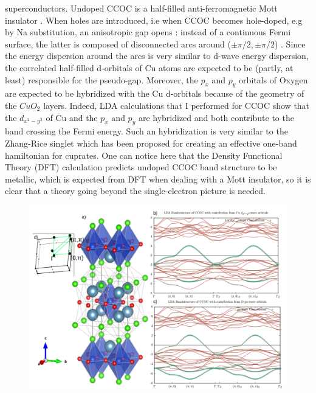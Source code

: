 \documentclass[12pt]{article}
\begin{document}
\begin{multicols}{2}
superconductors. Undoped CCOC is a half-filled anti-ferromagnetic Mott insulator 
\cite{Ronning-CCOCARPES}. When holes are introduced, i.e when CCOC becomes 
hole-doped, e.g by Na substitution, an anisotropic gap opens : instead of a 
continuous Fermi surface, the latter is composed of disconnected arcs around 
($\pm\pi/2,\pm\pi/2$) \cite{Norman-FS_destruction}. Since the energy dispersion 
around the arcs is very similar to d-wave energy dispersion, the correlated 
half-filled d-orbitals of Cu atoms are expected to be (partly, at least) 
responsible for the pseudo-gap. Moreover, the $p_{x}$ and $p_{y}$ orbitals of 
Oxygen are expected to be hybridized with the Cu d-orbitals because of the 
geometry of the $CuO_{2}$ layers. Indeed, LDA calculations that I performed for 
CCOC show that the $d_{x^{2}-y^{2}}$ of Cu and the $p_{x}$ and $p_{y}$ are 
hybridized and both contribute to the band crossing the Fermi energy. Such an 
hybridization is very similar to the Zhang-Rice singlet 
\cite{Zhang-rice-singlet} which has been proposed for creating an effective 
one-band hamiltonian for cuprates. One can notice here that the Density 
Functional Theory (DFT) calculation predicts undoped CCOC band structure to be 
metallic, which is expected from DFT when dealing with a Mott insulator, so it 
is clear that a theory going beyond the single-electron picture is needed. \par
\begin{figure}
    \centering
    \includegraphics[scale=0.5]{crystal-structure-LDA-CCOC-kpath.png}

\end{figure}
\end{multicols}
\end{document}
